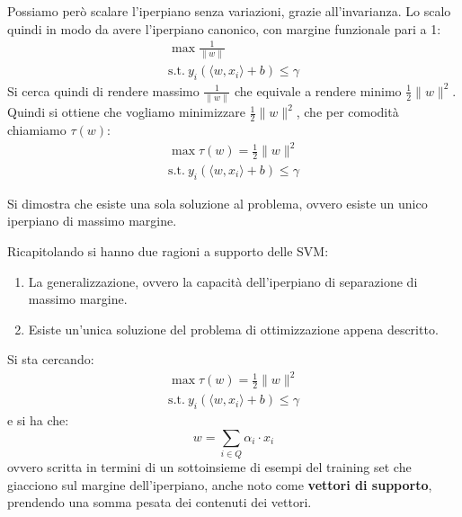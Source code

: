 Possiamo però scalare l'iperpiano senza variazioni, grazie all'invarianza.
Lo scalo quindi in modo da avere l'iperpiano canonico, con margine funzionale
pari a 1:
\begin{equation*}
    \begin{aligned}
        \max \frac{1}{\|w\|} \\ \text{s.t.} \ y_i(\langle w, x_i \rangle + b)
        \leq \gamma
    \end{aligned}
\end{equation*}
Si cerca quindi di rendere massimo $\frac{1}{\|w\|}$ che equivale a rendere
minimo $\frac{1}{2} \| w \|^2$. Quindi si ottiene che vogliamo minimizzare
$\frac{1}{2} \| w \|^2$, che per comodità chiamiamo $\tau (w)$:
\begin{equation*}
    \begin{aligned}
        \max \tau(w) = \frac{1}{2}  \| w\|^2 \\ \text{s.t.} \ y_i (\langle w, x_i
        \rangle + b) \leq \gamma
    \end{aligned}
\end{equation*}
\begin{teorema}
    Si dimostra che esiste una sola soluzione al problema, ovvero esiste un unico
    iperpiano di massimo margine.
\end{teorema}
Ricapitolando si hanno due ragioni a supporto delle SVM:
\begin{enumerate}
    \item La generalizzazione, ovvero la capacità dell'iperpiano di separazione
          di massimo margine.
    \item Esiste un'unica soluzione del problema di ottimizzazione appena descritto.
\end{enumerate}
Si sta cercando:
\begin{equation*}
    \begin{aligned}
        \max \tau(w) = \frac{1}{2}  \| w\|^2 \\ \text{s.t.} \ y_i (\langle w, x_i
        \rangle + b) \leq \gamma
    \end{aligned}
\end{equation*}
e si ha che:
\begin{equation}
    w = \sum_{i \in Q} \alpha_i \cdot x_i
\end{equation}
ovvero scritta in termini di un sottoinsieme di esempi del training set che
giacciono sul margine dell'iperpiano, anche noto come \textbf{vettori di supporto},
prendendo una somma pesata dei contenuti dei vettori.

